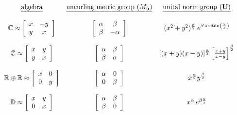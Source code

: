 \documentclass{amsart}
\numberwithin{equation}{section}
\theoremstyle{definition}
\numberwithin{theorem}{section}
\begin{document}
\hspace{-0cm}$ \begin{array}{cccccccc} 
\mbox{\underline{algebra}} & \mbox{\underline{uncurling metric group $(M_{\mathbf{u}})$}} & \mbox{\underline{unital norm group ($\mathbf{U}$)}}  \\ 
\\
\mathbb{C} \approx \left[\begin{array}{ccc}
x  & -y    \\
 y & x \\   
\end{array}\right]   & \left[\begin{array}{ccc}
\alpha  & \beta    \\
 \beta & -\alpha \\   
\end{array}\right]  & (x^2+y^2)^{\frac{\alpha}{2}} \,e^{\beta\,{\rm arctan}\left(\frac{y}{x}\right)}  \\ \\
\slashed{\mathbb{C}} \approx \left[\begin{array}{ccc}
x  & y    \\
 y & x \\   
\end{array}\right]   & \left[\begin{array}{ccc}
\alpha  & \beta    \\
 \beta & \alpha \\   
\end{array}\right]  & [(x+y)(x-y)]^{\frac{\alpha}{2}} \left[\frac{x+y}{x-y}\right]^{\frac{\beta}{2}}  \\ \\ 
\mathbb{R}\oplus\mathbb{R} \approx \left[\begin{array}{ccc}
x  & 0    \\
 0 & y \\   
\end{array}\right]   & \left[\begin{array}{ccc}
\alpha  & 0    \\
 0 & \beta \\   
\end{array}\right]  & x^\frac{\alpha}{2} y^\frac{\beta}{2}  \\ \\
\mathbb{D} \approx \left[\begin{array}{ccc}
x  & y    \\
 0 & x \\   
\end{array}\right]   & \left[\begin{array}{ccc}
\alpha  & \beta    \\
 \beta & 0 \\   
\end{array}\right]  & x^\alpha\,e^{\beta \frac{y}{x}}  \\ \\
\end{array} $
\end{document}
